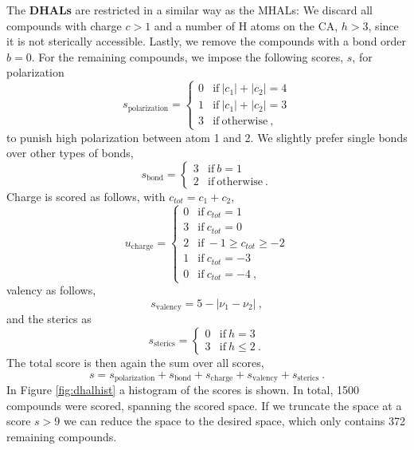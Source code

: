 \documentclass[]{article}
\begin{document}
The \textbf{DHALs} are restricted in a similar way as the MHALs: We discard all compounds with charge $c > 1$ and a number of H atoms on the CA, $h > 3$, since it is not sterically accessible. Lastly, we remove the compounds with a bond order $b = 0$. For the remaining compounds, we impose the following scores, $s$, for polarization
\begin{equation}
	s_{\textrm{polarization}} = 
	\begin{cases}
	0	&	\mathrm{if}~ |c_1| + |c_2| = 4 \\
	1	&	\mathrm{if}~ |c_1| + |c_2| = 3 \\
	3   &	\mathrm{if}~ \mathrm{otherwise} ~,
	\end{cases}
\end{equation}
to punish high polarization between atom 1 and 2. We slightly prefer single bonds over other types of bonds,
\begin{equation}
	s_{\textrm{bond}} = 
	\begin{cases}
	3	&	\mathrm{if}~ b = 1 \\
	2	&	\mathrm{if}~ \textrm{otherwise} ~.
	\end{cases}
\end{equation}
Charge is scored as follows, with $c_{tot} = c_1 + c_2$,
\begin{equation}
u_{\textrm{charge}} = 
\begin{cases}
0	&	\mathrm{if}~ c_{tot} = 1 \\
3	&	\mathrm{if}~ c_{tot} = 0 \\
2   &	\mathrm{if}~ -1 \geq c_{tot} \geq -2 \\
1   &	\mathrm{if}~ c_{tot} = -3 \\
0   &	\mathrm{if}~ c_{tot} = -4 ~,
\end{cases}
\end{equation}
valency as follows,
\begin{equation}
	s_{\textrm{valency}} = 5 - |\nu_1 - \nu_2| ~,
\end{equation}
and the sterics as
\begin{equation}
	s_{\textrm{sterics}} = 
	\begin{cases}
	0	&	\mathrm{if}~ h = 3 \\
	3	&	\mathrm{if}~ h \leq 2 ~.
	\end{cases}
\end{equation}
The total score is then again the sum over all scores,
\begin{equation}
	s = s_{\textrm{polarization}} + s_{\textrm{bond}} + s_{\textrm{charge}} + s_{\textrm{valency}} + s_{\textrm{sterics}} ~.
\end{equation}
In Figure \ref{fig:dhalhist} a histogram of the scores is shown. In total, 1500 compounds were scored, spanning the scored space. If we truncate the space at a score $s > 9$ we can reduce the space to the desired space, which only contains 372 remaining compounds. 
\end{document}
